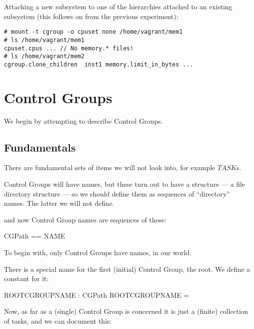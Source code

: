 \documentclass[a4paper,twoside,12pt]{article}
\begin{document}
Attaching a new subsystem to one of the hierarchies attached to an existing subsystem (this follows on from the previous experiment):
\begin{verbatim}
# mount -t cgroup -o cpuset none /home/vagrant/mem1
# ls /home/vagrant/mem1
cpuset.cpus ... // No memory.* files!
# ls /home/vagrant/mem2
cgroup.clone_children  inst1 memory.limit_in_bytes ...
\end{verbatim}

\section{Control Groups}

We begin by attempting to describe Control Groups.

\subsection{Fundamentals}
There are fundamental sets of items we will not look into, for example $TASK$s.
\begin{zed}
[TASK]
\end{zed}

Control Groups will have names, but these turn out to have a structure --- a file directory structure --- so we should define them as sequences of ``directory'' names. The latter we will not define.

\begin{zed}
[NAME]
\end{zed}
and now Control Group names are sequences of these:

\begin{zed}
CGPath == \seq NAME
\end{zed}

To begin with, only Control Groups have names, in our world.

There is a special name for the first (initial) Control Group, the root. We define a constant for it:

\begin{axdef}{}
ROOTCGROUPNAME : CGPath
\where
ROOTCGROUPNAME = \langle \rangle
\end{axdef}

Now, as far as a (single) Control Group is concerned it is just a (finite) collection of tasks, and we can document this:
\end{document}
